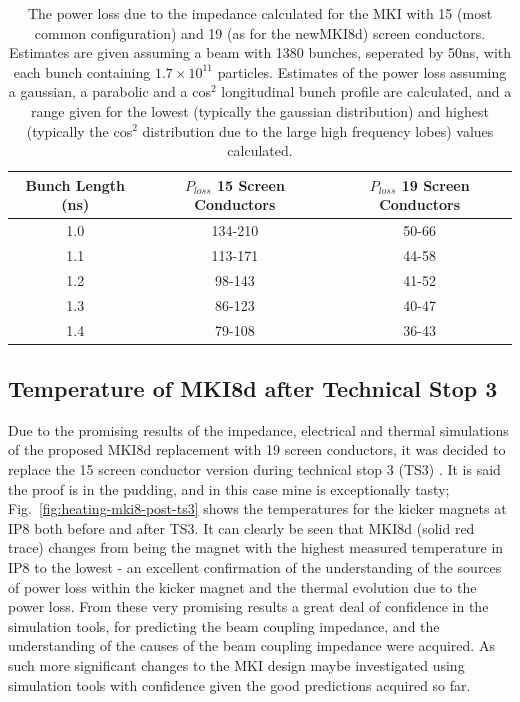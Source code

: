 \begin{table}
\caption{The power loss due to the impedance calculated for the MKI with 15 (most common configuration) and 19 (as for the newMKI8d) screen conductors. Estimates are given assuming a beam with 1380 bunches, seperated by 50ns, with each bunch containing $1.7 \times 10^{11}$ particles. Estimates of the power loss assuming a gaussian, a parabolic and a cos$^{2}$ longitudinal bunch profile are calculated, and a range given for the lowest (typically the gaussian distribution) and highest (typically the cos$^{2}$ distribution due to the large high frequency lobes) values calculated.}
\label{tab:heating-15-19-cond}
\begin{center}
\begin{tabular}{c | c | c}
Bunch Length (ns) & $P_{loss}$ 15 Screen Conductors & $P_{loss}$ 19 Screen Conductors \\ \hline
1.0 &  134-210 & 50-66 \\ \hline
1.1 &  113-171 & 44-58 \\ \hline
1.2 &  98-143 & 41-52 \\ \hline
1.3 &  86-123 & 40-47 \\ \hline
1.4 &  79-108 & 36-43 \\ \hline
\end{tabular}
\end{center}
\end{table}

\subsection{Temperature of MKI8d after Technical Stop 3}

Due to the promising results of the impedance, electrical and thermal simulations of the proposed MKI8d replacement with 19 screen conductors, it was decided to replace the 15 screen conductor version during technical stop 3 (TS3) \cite{Barnes:emisMKITemp}. It is said the proof is in the pudding, and in this case mine is exceptionally tasty; Fig.~\ref{fig:heating-mki8-post-ts3} shows the temperatures for the kicker magnets at IP8 both before and after TS3. It can clearly be seen that MKI8d (solid red trace) changes from being the magnet with the highest measured temperature in IP8 to the lowest - an excellent confirmation of the understanding of the sources of power loss within the kicker magnet and the thermal evolution due to the power loss. From these very promising results a great deal of confidence in the simulation tools, for predicting the beam coupling impedance, and the understanding of the causes of the beam coupling impedance were acquired. As such more significant changes to the MKI design maybe investigated using simulation tools with confidence given the good predictions acquired so far.

